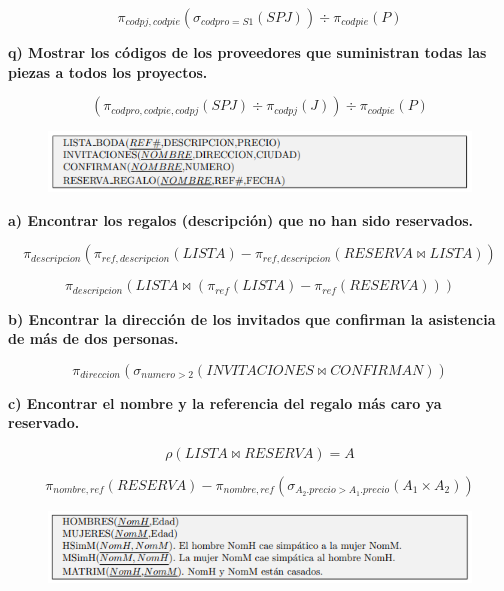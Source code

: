 \documentclass[a4paper,11pt]{article}
\begin{document}
\begin{equation*}
\pi_{codpj,codpie}(\sigma_{codpro=S1}(SPJ)) \div \pi_{codpie}(P)
\end{equation*}

\textbf{q) Mostrar los códigos de los proveedores que suministran todas las piezas a todos
los proyectos.}

\begin{equation*}
	(\pi_{codpro,codpie,codpj}(SPJ) \div \pi_{codpj}(J)) \div \pi_{codpie}(P)
\end{equation*}

\begin{figure}[h]
\centering
\includegraphics[scale=1,width=1\textwidth]{ejer_2.png}
\end{figure}

\textbf{a) Encontrar los regalos (descripción) que no han sido reservados.}

\begin{equation*}
\pi_{descripcion}(\pi_{ref,descripcion}(LISTA)-\pi_{ref,descripcion}(RESERVA\Join LISTA))
\end{equation*}

\begin{equation*}
\pi_{descripcion}(LISTA \Join (\pi_{ref}(LISTA)-\pi_{ref}(RESERVA)))
\end{equation*}

\textbf{b) Encontrar la dirección de los invitados que confirman la asistencia de más de
dos personas.}

\begin{equation*}
\pi_{direccion}(\sigma_{numero>2}(INVITACIONES \Join CONFIRMAN))
\end{equation*}

\textbf{c) Encontrar el nombre y la referencia del regalo más caro ya reservado.}

\begin{equation*}
\rho(LISTA\Join RESERVA)=A
\end{equation*}

\begin{equation*}
\pi_{nombre,ref}(RESERVA)-\pi_{nombre,ref}(\sigma_{A_2.precio>A_1.precio}(A_1\times A_2))
\end{equation*}

\begin{figure}[h]
\centering
\includegraphics[scale=1,width=1\textwidth]{ejer3.png}
\end{figure}
\end{document}
